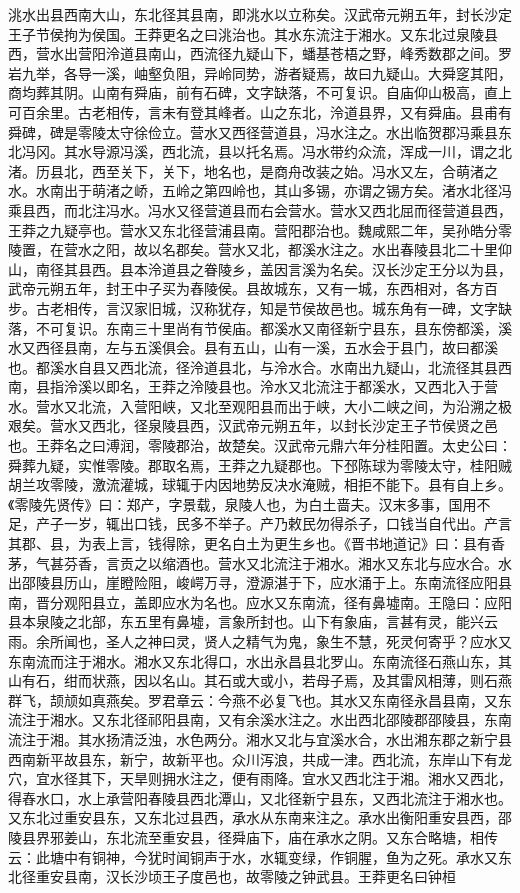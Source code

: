 \documentclass[12pt,UTF8]{ctexbook}
\begin{document}
洮水出县西南大山，东北径其县南，即洮水以立称矣。汉武帝元朔五年，封长沙定王子节侯拘为侯国。王莽更名之曰洮治也。其水东流注于湘水。又东北过泉陵县西，营水出营阳泠道县南山，西流径九疑山下，蟠基苍梧之野，峰秀数郡之间。罗岩九举，各导一溪，岫壑负阻，异岭同势，游者疑焉，故曰九疑山。大舜窆其阳，商均葬其阴。山南有舜庙，前有石碑，文字缺落，不可复识。自庙仰山极高，直上可百余里。古老相传，言未有登其峰者。山之东北，泠道县界，又有舜庙。县甫有舜碑，碑是零陵太守徐俭立。营水又西径营道县，冯水注之。水出临贺郡冯乘县东北冯冈。其水导源冯溪，西北流，县以托名焉。冯水带约众流，浑成一川，谓之北渚。历县北，西至关下，关下，地名也，是商舟改装之始。冯水又左，合萌渚之水。水南出于萌渚之峤，五岭之第四岭也，其山多锡，亦谓之锡方矣。渚水北径冯乘县西，而北注冯水。冯水又径营道县而右会营水。营水又西北屈而径营道县西，王莽之九疑亭也。营水又东北径营浦县南。营阳郡治也。魏咸熙二年，吴孙皓分零陵置，在营水之阳，故以名郡矣。营水又北，都溪水注之。水出春陵县北二十里仰山，南径其县西。县本泠道县之眷陵乡，盖因言溪为名矣。汉长沙定王分以为县，武帝元朔五年，封王中子买为舂陵侯。县故城东，又有一城，东西相对，各方百步。古老相传，言汉家旧城，汉称犹存，知是节侯故邑也。城东角有一碑，文字缺落，不可复识。东南三十里尚有节侯庙。都溪水又南径新宁县东，县东傍都溪，溪水又西径县南，左与五溪俱会。县有五山，山有一溪，五水会于县门，故曰都溪也。都溪水自县又西北流，径泠道县北，与泠水合。水南出九疑山，北流径其县西南，县指泠溪以即名，王莽之泠陵县也。泠水又北流注于都溪水，又西北入于营水。营水又北流，入营阳峡，又北至观阳县而出于峡，大小二峡之间，为沿溯之极艰矣。营水又西北，径泉陵县西，汉武帝元朔五年，以封长沙定王子节侯贤之邑也。王莽名之曰溥润，零陵郡治，故楚矣。汉武帝元鼎六年分桂阳置。太史公曰：舜葬九疑，实惟零陵。郡取名焉，王莽之九疑郡也。下邳陈球为零陵太守，桂阳贼胡兰攻零陵，激流灌城，球辄于内因地势反决水淹贼，相拒不能下。县有自上乡。《零陵先贤传》曰：郑产，字景载，泉陵人也，为白土啬夫。汉末多事，国用不足，产子一岁，辄出口钱，民多不举子。产乃敕民勿得杀子，口钱当自代出。产言其郡、县，为表上言，钱得除，更名白土为更生乡也。《晋书地道记》曰：县有香茅，气甚芬香，言贡之以缩酒也。营水又北流注于湘水。湘水又东北与应水合。水出邵陵县历山，崖瞪险阻，峻崿万寻，澄源湛于下，应水涌于上。东南流径应阳县南，晋分观阳县立，盖即应水为名也。应水又东南流，径有鼻墟南。王隐曰：应阳县本泉陵之北部，东五里有鼻墟，言象所封也。山下有象庙，言甚有灵，能兴云雨。余所闻也，圣人之神曰灵，贤人之精气为鬼，象生不慧，死灵何寄乎？应水又东南流而注于湘水。湘水又东北得口，水出永昌县北罗山。东南流径石燕山东，其山有石，绀而状燕，因以名山。其石或大或小，若母子焉，及其雷风相薄，则石燕群飞，颉颃如真燕矣。罗君章云：今燕不必复飞也。其水又东南径永昌县南，又东流注于湘水。又东北径祁阳县南，又有余溪水注之。水出西北邵陵郡邵陵县，东南流注于湘。其水扬清泛浊，水色两分。湘水又北与宜溪水合，水出湘东郡之新宁县西南新平故县东，新宁，故新平也。众川泻浪，共成一津。西北流，东岸山下有龙穴，宜水径其下，天旱则拥水注之，便有雨降。宜水又西北注于湘。湘水又西北，得舂水口，水上承营阳春陵县西北潭山，又北径新宁县东，又西北流注于湘水也。又东北过重安县东，又东北过县西，承水从东南来注之。承水出衡阳重安县西，邵陵县界邪姜山，东北流至重安县，径舜庙下，庙在承水之阴。又东合略塘，相传云：此塘中有铜神，今犹时闻铜声于水，水辄变绿，作铜腥，鱼为之死。承水又东北径重安县南，汉长沙顷王子度邑也，故零陵之钟武县。王莽更名曰钟桓
\end{document}
